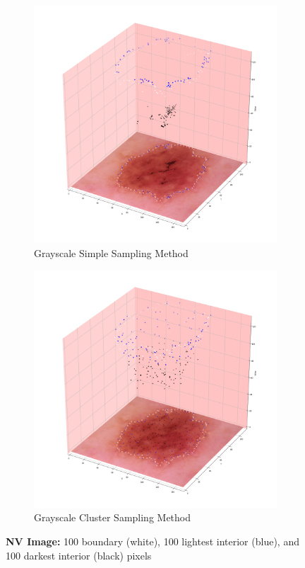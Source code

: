 \documentclass[11pt, reqno]{amsart}
\theoremstyle{plain}
\theoremstyle{definition}
\begin{document}
\begin{figure}
\centering
\begin{subfigure}{.5\textwidth}
  \centering
  \includegraphics[width=\linewidth]{simple_nv20.png}
  \caption{Grayscale Simple Sampling Method}
\end{subfigure}%
\begin{subfigure}{.5\textwidth}
  \centering
  \includegraphics[width=\linewidth]{cluster_nv20.png}
  \caption{Grayscale Cluster Sampling Method}
\end{subfigure}
\caption{{\bfseries NV Image:} 100 boundary (white), 100 lightest interior (blue), and 100 darkest interior (black) pixels}
\label{fig:nv}
\end{figure}
\end{document}
